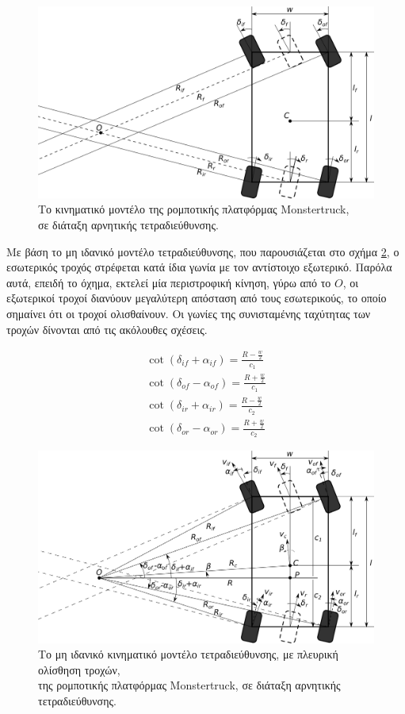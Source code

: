 {\begin{figure}[!ht]
	\centering
	\includegraphics[width=0.7\linewidth]{Chapters/Chapter2/Figures/monstertruck_model_parallel.png}
	\caption{Το κινηματικό μοντέλο της ρομποτικής πλατφόρμας Monstertruck,\\ σε διάταξη αρνητικής τετραδιεύθυνσης.}
	\label{fig:monstetruck_model}
\end{figure}

\bigskip
Με βάση το μη ιδανικό μοντέλο τετραδιεύθυνσης, που παρουσιάζεται στο σχήμα \ref{fig:monstertruck_slip_angle_model}, ο εσωτερικός τροχός στρέφεται κατά ίδια γωνία με τον αντίστοιχο εξωτερικό. Παρόλα αυτά, επειδή το όχημα, εκτελεί μία περιστροφική κίνηση, γύρω από το $O$, οι εξωτερικοί τροχοί διανύουν μεγαλύτερη απόσταση από τους εσωτερικούς, το οποίο σημαίνει ότι οι τροχοί ολισθαίνουν. Οι γωνίες της συνισταμένης ταχύτητας των τροχών δίνονται από τις ακόλουθες σχέσεις.

\begin{align}
	\cot(\delta_{if} + \alpha_{if}) = \frac{R - \frac{w}{2}}{c_1}
	\label{eq:monst_dif}\\
	\cot(\delta_{of} - \alpha_{of}) = \frac{R + \frac{w}{2}}{c_1}
	\label{eq:monst_dof}\\
	\cot(\delta_{ir} + \alpha_{ir}) = \frac{R - \frac{w}{2}}{c_2} 
	\label{eq:monst_dir}\\
	\cot(\delta_{or} - \alpha_{or}) = \frac{R + \frac{w}{2}}{c_2}
	\label{eq:monst_dor}
\end{align}


\begin{figure}[!ht]
	\centering
	\includegraphics[width=0.7\linewidth]{Chapters/Chapter2/Figures/monstertruck_slip_angle_model_parallel.png}
	\caption{Το μη ιδανικό κινηματικό μοντέλο τετραδιεύθυνσης, με πλευρική ολίσθηση τροχών,\\ της ρομποτικής πλατφόρμας Monstertruck, σε διάταξη αρνητικής τετραδιεύθυνσης.}
	\label{fig:monstertruck_slip_angle_model}
\end{figure}

}

